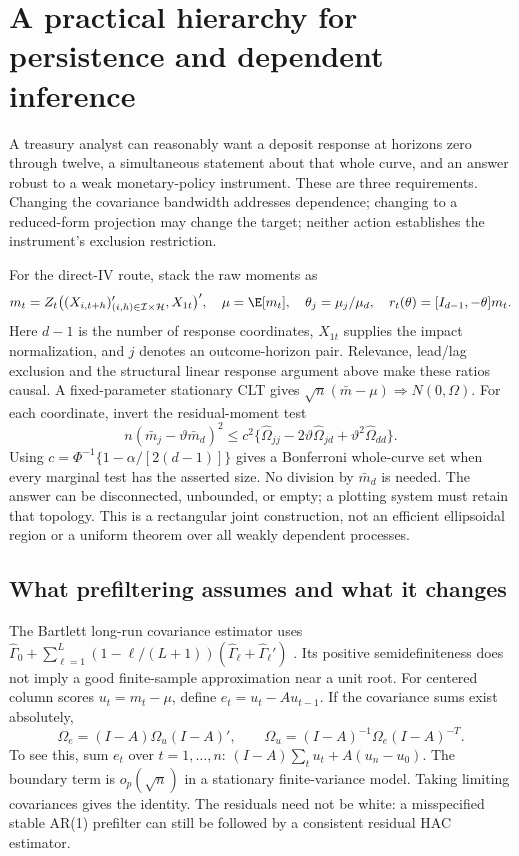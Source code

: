 \section{A practical hierarchy for persistence and dependent inference}
\label{s5:response-inference}
A treasury analyst can reasonably want a deposit response at horizons zero
through twelve, a simultaneous statement about that whole curve, and an
answer robust to a weak monetary-policy instrument. These are three
requirements. Changing the covariance bandwidth addresses dependence;
changing to a reduced-form projection may change the target; neither action
establishes the instrument's exclusion restriction.

For the direct-IV route, stack the raw moments as
\[
 m_t=Z_t\big((X_{i,t+h})_{(i,h)\in\mathcal I\times\mathcal H}',X_{1t}\big)',
 \quad \mu=\E[m_t],\quad \theta_j=\mu_j/\mu_d,
 \quad r_t(\theta)=[I_{d-1},-\theta]m_t.
\]
Here $d-1$ is the number of response coordinates, $X_{1t}$ supplies the
impact normalization, and $j$ denotes an outcome-horizon pair. Relevance,
lead/lag exclusion and the structural linear response argument above make
these ratios causal. A fixed-parameter stationary CLT gives
$\sqrt n(\bar m-\mu)\Rightarrow N(0,\Omega)$.
For each coordinate, invert the residual-moment test
\begin{equation}
 n(\bar m_j-\vartheta\bar m_d)^2\le
 c^2\{\hat\Omega_{jj}-2\vartheta\hat\Omega_{jd}
                +\vartheta^2\hat\Omega_{dd}\}.
 \label{s5:residual-set}
\end{equation}
Using $c=\Phi^{-1}\{1-\alpha/[2(d-1)]\}$ gives a Bonferroni whole-curve
set when every marginal test has the asserted size. No division by
$\bar m_d$ is needed. The answer can be disconnected, unbounded, or empty;
a plotting system must retain that topology. This is a rectangular joint
construction, not an efficient ellipsoidal region or a uniform theorem over
all weakly dependent processes.

\subsection{What prefiltering assumes and what it changes}
The Bartlett long-run covariance estimator uses
$\hat\Gamma_0+\sum_{\ell=1}^L(1-\ell/(L+1))
(\hat\Gamma_\ell+\hat\Gamma_\ell')$ \citep{newey1986}. Its positive
semidefiniteness does not imply a good finite-sample approximation near a
unit root. For centered column scores $u_t=m_t-\mu$, define
$e_t=u_t-Au_{t-1}$. If the covariance sums exist absolutely,
\[
 \Omega_e=(I-A)\Omega_u(I-A)',\qquad
 \Omega_u=(I-A)^{-1}\Omega_e(I-A)^{-T}.
\]
To see this, sum $e_t$ over $t=1,\ldots,n$:
$(I-A)\sum_tu_t+A(u_n-u_0)$. The boundary term is $o_p(\sqrt n)$ in a
stationary finite-variance model. Taking limiting covariances gives the
identity. The residuals need not be white: a misspecified stable AR(1)
prefilter can still be followed by a consistent residual HAC estimator.

